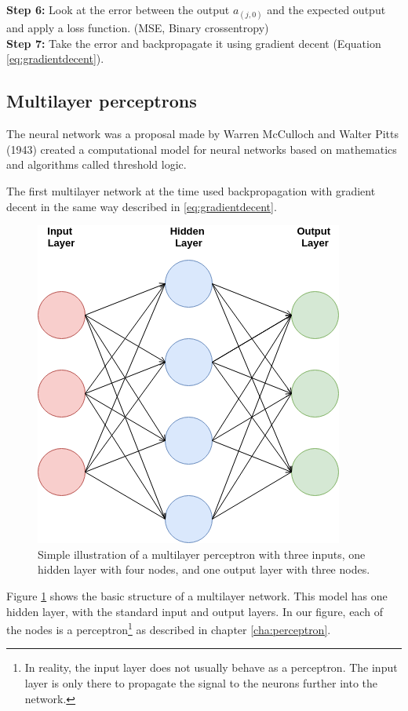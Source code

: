 \noindent \textbf{Step 6:} Look at the error between the output $a_{(j,0)}$ and the expected output and apply a loss function. (MSE, Binary crossentropy)\\

\noindent \textbf{Step 7:} Take the error and backpropagate it using gradient decent (Equation \ref{eq:gradientdecent}).\\





\subsection{Multilayer perceptrons}
\label{cha:MLP}
The neural network was a proposal made by Warren McCulloch and Walter Pitts (1943) \cite{roweis2000nonlinear}  created a computational model for neural networks based on mathematics and algorithms called threshold logic. 

The first multilayer network at the time used backpropagation with gradient decent in the same way described in \ref{eq:gradientdecent}.

\begin{figure}[h]
\centering
\includegraphics[scale=0.7]{background/figures/neural_network.png}
\caption{Simple illustration of a multilayer perceptron with three inputs, one hidden layer with four nodes, and one output layer with three nodes.}
\label{fig:mlnn}
\end{figure}


Figure \ref{fig:mlnn} shows the basic structure of a multilayer network. This model has one hidden layer, with the standard input and output layers. In our figure, each of the nodes is a perceptron\footnote{In reality, the input layer does not usually behave as a perceptron. The input layer is only there to propagate the signal to the neurons further into the network.} as described in chapter \ref{cha:perceptron}.

